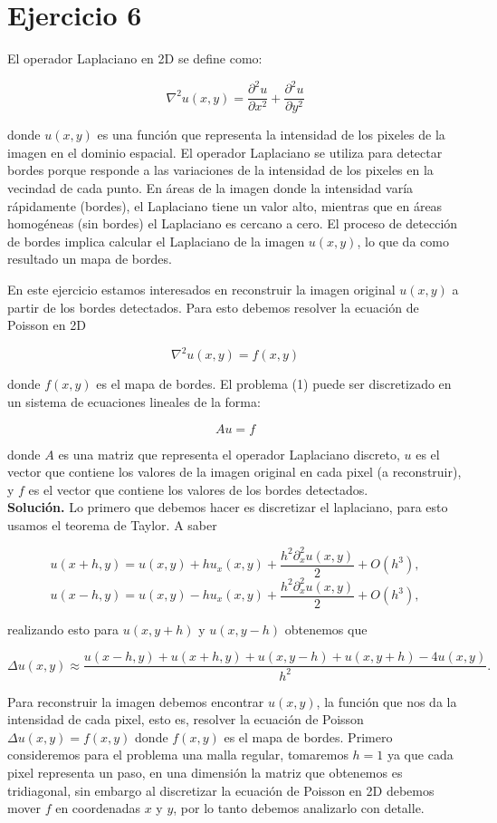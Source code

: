 
\section*{Ejercicio 6}
El operador Laplaciano en 2D se define como:

$$
\nabla^2 u(x, y)=\frac{\partial^2 u}{\partial x^2}+\frac{\partial^2 u}{\partial y^2}
$$

donde $u(x, y)$ es una función que representa la intensidad de los pixeles de la imagen en el dominio espacial. El operador Laplaciano se utiliza para detectar bordes porque responde a las variaciones de la intensidad de los pixeles en la vecindad de cada punto. En áreas de la imagen donde la intensidad varía rápidamente (bordes), el Laplaciano tiene un valor alto, mientras que en áreas homogéneas (sin bordes) el Laplaciano es cercano a cero. El proceso de detección de bordes implica calcular el Laplaciano de la imagen $u(x, y)$, lo que da como resultado un mapa de bordes.

En este ejercicio estamos interesados en reconstruir la imagen original $u(x, y)$ a partir de los bordes detectados. Para esto debemos resolver la ecuación de Poisson en 2D

$$
\nabla^2 u(x, y)=f(x, y)
$$

donde $f(x, y)$ es el mapa de bordes.
El problema (1) puede ser discretizado en un sistema de ecuaciones lineales de la forma:

$$
A u=f
$$

donde $A$ es una matriz que representa el operador Laplaciano discreto, $u$ es el vector que contiene los valores de la imagen original en cada pixel (a reconstruir), y $f$ es el vector que contiene los valores de los bordes detectados.\\

\textbf{Solución.} Lo primero que debemos hacer es  discretizar el laplaciano,  para esto usamos el teorema de Taylor. A saber

    $$u(x+h,y)=u(x,y)+h u_x(x,y)+\frac{h^2\partial^2_{x}u(x,y)}{2}+O(h^3),$$
    $$u(x-h,y)=u(x,y)-h u_x(x,y)+\frac{h^2\partial^2_x u(x,y)}{2}+O(h^3),$$

    realizando esto para $u(x,y+h)$ y $u(x,y-h)$ obtenemos que

    $$\Delta u(x, y) \approx \frac{u(x-h, y)+u(x+h, y)+u(x, y-h)+u(x, y+h)-4 u(x, y)}{h^2}.$$

    Para reconstruir la imagen debemos encontrar $u(x,y)$, la función que nos da la intensidad de cada pixel, esto es, resolver la ecuación de  Poisson $\Delta u(x,y)= f(x,y)$ donde $f(x,y)$ es el mapa de bordes. Primero consideremos para el problema una malla regular, tomaremos $h=1$ ya que cada pixel representa un paso, en una  dimensión la matriz que obtenemos es tridiagonal, sin embargo al discretizar la ecuación de Poisson en 2D debemos mover $f$ en coordenadas $x$ y $y$, por lo tanto debemos analizarlo con detalle.\\

